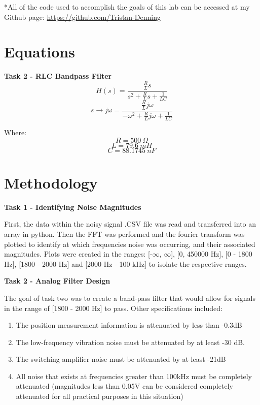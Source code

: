 \documentclass[hidelinks, 12pt]{report}
\begin{document}
*All of the code used to accomplish the goals of this lab can be accessed at my Github page: 
\url{https://github.com/Tristan-Denning}

\section{Equations} 
\textbf{Task 2 - RLC Bandpass Filter}
\begin{equation}
    H(s) = \frac{\frac{R}{L}s}{s^2+\frac{R}{L}s+ \frac{1}{LC}}
    \end{equation}
    \begin{equation*}
    s\rightarrow j\omega = \frac{\frac{R}{L}j\omega}{-\omega^2+\frac{R}{L}j\omega+ \frac{1}{LC}}
    \end{equation*}
    
Where:
\[ R = 500 \ \Omega \]
\[ L = 79.6 \  mH \]
\[ C = 88.1745 \  nF \]

\newpage
\section {Methodology}      
    \textbf{Task 1 - Identifying Noise Magnitudes }
    
    First, the data within the noisy signal .CSV file was read and transferred into an array in python. Then the FFT was performed and the fourier transform was plotted to identify at which frequencies noise was occurring, and their associated magnitudes. Plots were created in the ranges: [-$\infty$, $\infty$], [0, 450000 Hz], [0 - 1800 Hz], [1800 - 2000 Hz] and [2000 Hz - 100 kHz] to isolate the respective ranges.
    
    \textbf{Task 2 - Analog Filter Design}
    
    The goal of task two was to create a band-pass filter that would allow for signals in the range of [1800 - 2000 Hz] to pass. Other specifications included: 
    \begin{enumerate}
        \item The position measurement information is attenuated by less than -0.3dB
        \item The low-frequency vibration noise must be attenuated by at least -30 dB.
        \item The switching amplifier noise must be attenuated by at least -21dB
        \item All noise that exists at frequencies greater than 100kHz must be completely attenuated
    (magnitudes less than 0.05V can be considered completely attenuated for all practical
    purposes in this situation)
    \end{enumerate}
    
\end{document}
